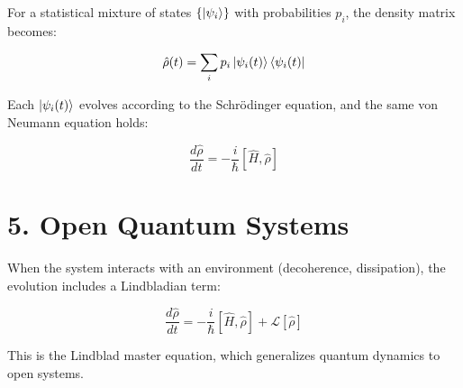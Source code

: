 \documentclass[12pt]{article}
\begin{document}
For a statistical mixture of states \( \{ \ket{\psi_i} \} \) with probabilities \( p_i \), the density matrix becomes:

\[
\hat{\rho}(t) = \sum_i p_i \ket{\psi_i(t)} \bra{\psi_i(t)}
\]

Each \( \ket{\psi_i(t)} \) evolves according to the Schrödinger equation, and the same von Neumann equation holds:

\[
\frac{d\hat{\rho}}{dt} = -\frac{i}{\hbar} [\hat{H}, \hat{\rho}]
\]

\section*{5. Open Quantum Systems}

When the system interacts with an environment (decoherence, dissipation), the evolution includes a Lindbladian term:

\[
\frac{d\hat{\rho}}{dt} = -\frac{i}{\hbar}[\hat{H}, \hat{\rho}] + \mathcal{L}[\hat{\rho}]
\]

This is the Lindblad master equation, which generalizes quantum dynamics to open systems.
\end{document}
